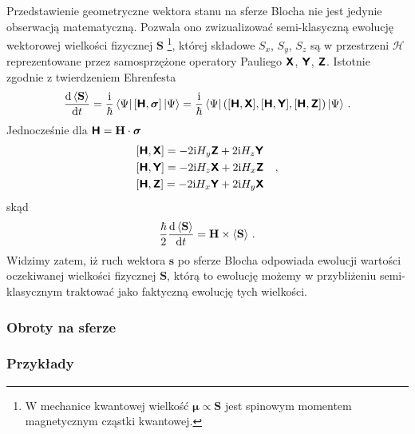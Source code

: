 \documentclass{myclass}
\begin{document}
Przedstawienie geometryczne wektora stanu na sferze Blocha nie jest jedynie obserwacją matematyczną.
Pozwala ono zwizualizować semi-klasyczną ewolucję wektorowej wielkości fizycznej \(\mathbf{S}\)
\footnote{W mechanice kwantowej wielkość \(\boldsymbol{\mu} \propto \mathbf{S}\) jest spinowym
momentem magnetycznym cząstki kwantowej.}, której składowe \(S_x\), \(S_y\), \(S_z\) są w
przestrzeni \(\mathscr{H}\) reprezentowane przez samosprzężone operatory Pauliego \(\boldsymbol{\mathsf{X}}\),
\(\boldsymbol{\mathsf{Y}}\), \(\boldsymbol{\mathsf{Z}}\). Istotnie zgodnie z twierdzeniem Ehrenfesta
\begin{equation*}
    \dv{\expval{\mathbf{S}}}{t} = \frac{\mathrm{i}}{\hbar}\bra{\Psi}[\boldsymbol{\mathsf{H}}, \boldsymbol{\sigma}]\ket{\Psi} = \frac{\mathrm{i}}{\hbar}\bra{\Psi}\left([\boldsymbol{\mathsf{H}},\boldsymbol{\mathsf{X}}],[\boldsymbol{\mathsf{H}},\boldsymbol{\mathsf{Y}}],[\boldsymbol{\mathsf{H}},\boldsymbol{\mathsf{Z}}]\right)\ket{\Psi}\,.
\end{equation*}
Jednocześnie dla \(\boldsymbol{\mathsf{H}} = \mathbf{H}\cdot\boldsymbol{\sigma}\)
\begin{equation*}
    \begin{split}
        &[\boldsymbol{\mathsf{H}},\boldsymbol{\mathsf{X}}] = -2\mathrm{i} H_y\boldsymbol{\mathsf{Z}} + 2\mathrm{i} H_z \boldsymbol{\mathsf{Y}}\\
        &[\boldsymbol{\mathsf{H}},\boldsymbol{\mathsf{Y}}] = -2\mathrm{i} H_z\boldsymbol{\mathsf{X}} + 2\mathrm{i} H_x \boldsymbol{\mathsf{Z}}\\
        &[\boldsymbol{\mathsf{H}},\boldsymbol{\mathsf{Z}}] = -2\mathrm{i} H_x\boldsymbol{\mathsf{Y}} + 2\mathrm{i} H_y \boldsymbol{\mathsf{X}}
    \end{split}\quad,
\end{equation*}
skąd
\begin{equation*}
    \frac{\hbar}{2}\dv{\expval{\mathbf{S}}}{t} = \mathbf{H} \times \expval{\mathbf{S}}\,.
\end{equation*}
Widzimy zatem, iż ruch wektora \(\mathbf{s}\) po sferze Blocha odpowiada ewolucji wartości
oczekiwanej wielkości fizycznej \(\mathbf{S}\), którą to ewolucję możemy w przybliżeniu
semi-klasycznym traktować jako faktyczną ewolucję tych wielkości.

\subsubsection{Obroty na sferze}

\subsubsection{Przykłady}
\end{document}
